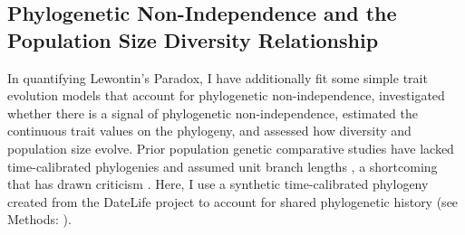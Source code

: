 \documentclass[11pt]{article}
\newcommand{\Newnameref}[1]{\textit{\nameref{#1}}}
\begin{document}
\subsection*{Phylogenetic Non-Independence and the Population Size Diversity Relationship}

In quantifying Lewontin's Paradox, I have additionally fit some simple trait
evolution models that account for phylogenetic non-independence, investigated
whether there is a signal of phylogenetic non-independence, estimated the
continuous trait values on the phylogeny, and assessed how diversity and
population size evolve. Prior population genetic comparative studies have
lacked time-calibrated phylogenies and assumed unit branch lengths
\parencite{Whitney2010-ud}, a shortcoming that has drawn criticism
\parencite{Lynch2011-qv}. Here, I use a synthetic time-calibrated phylogeny
created from the DateLife project \parencite{OMeara2020-ds} to account for
shared phylogenetic history (see Methods: \Newnameref{sec:methods-pcm}).
\end{document}
